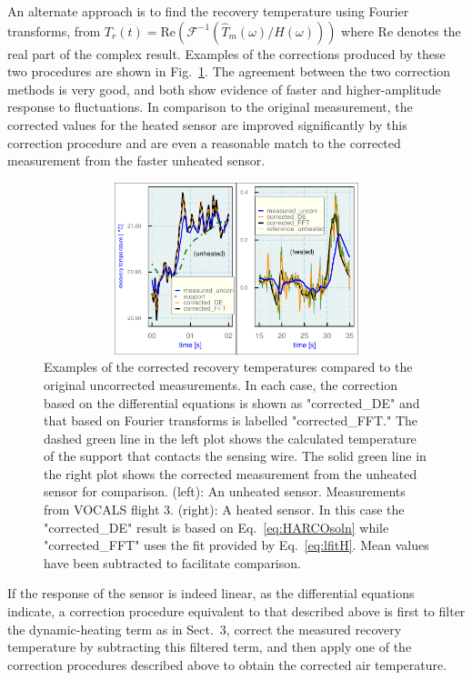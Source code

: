 \documentclass[amt, manuscript]{copernicus}
\begin{document}
An alternate approach is to find the recovery temperature using Fourier
transforms, from
\(T_{r}(t)=\mathrm{Re}\left(\mathcal{F}^{-1}\left(\hat{T}_{m}(\omega)/H(\omega)\right)\right)\)
where Re denotes the real part of the complex result. Examples of the
corrections produced by these two procedures are shown in
Fig.~\ref{fig:sampleFFT}. The agreement between the two correction
methods is very good, and both show evidence of faster and
higher-amplitude response to fluctuations. In comparison to the original
measurement, the corrected values for the heated sensor are improved
significantly by this correction procedure and are even a reasonable
match to the corrected measurement from the faster unheated sensor.

\begin{figure}

\begin{center}\includegraphics[width=12cm,height=5cm]{figure/figA1} \end{center}
\caption{Examples of the corrected recovery temperatures compared to the original uncorrected measurements. In each case, the correction based on the differential equations is shown as "corrected\_DE" and that based on Fourier transforms is labelled "corrected\_FFT." The dashed green line in the left plot shows the calculated temperature of the support that contacts the sensing wire. The solid green line in the right plot shows the corrected measurement from the unheated sensor for comparison. (left): An unheated sensor. Measurements from VOCALS flight 3. (right): A heated sensor. In this case the "corrected\_DE" result is based on Eq.\ \eqref{eq:HARCOsoln} while "corrected\_FFT" uses the fit provided by Eq.\ \eqref{eq:lfitH}. Mean values have been subtracted to facilitate comparison.\label{fig:sampleFFT}}
\end{figure}

If the response of the sensor is indeed linear, as the differential
equations indicate, a correction procedure equivalent to that described
above is first to filter the dynamic-heating term as in Sect.~3, correct
the measured recovery temperature by subtracting this filtered term, and
then apply one of the correction procedures described above to obtain
the corrected air temperature.
\end{document}

